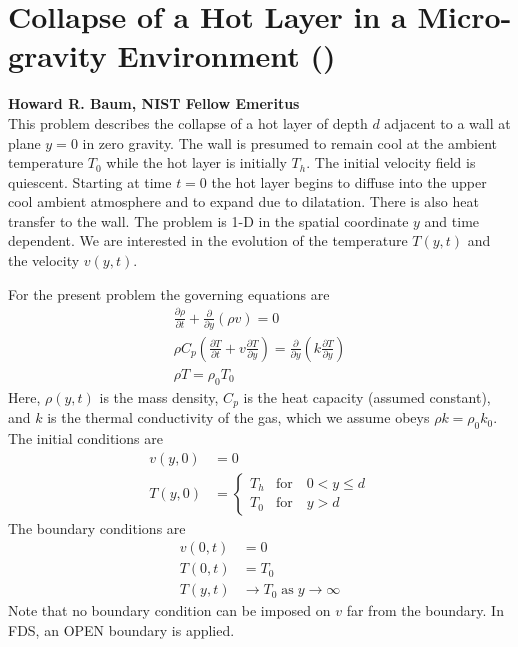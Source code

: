 \documentclass[11pt]{book}
\begin{document}
\section{Collapse of a Hot Layer in a Micro-gravity Environment (\texorpdfstring{}{hot\_layer\_360})}
\label{sec:baum_hot_layer}

\textbf{Howard R. Baum, NIST Fellow Emeritus}\\

\noindent This problem describes the collapse of a hot layer of depth $d$ adjacent to a wall at plane $y=0$ in zero gravity.  The wall is presumed to remain cool at the ambient temperature $T_0$ while the hot layer is initially $T_h$.  The initial velocity field is quiescent.  Starting at time $t=0$ the hot layer begins to diffuse into the upper cool ambient atmosphere and to expand due to dilatation.  There is also heat transfer to the wall.  The problem is 1-D in the spatial coordinate $y$ and time dependent.  We are interested in the evolution of the temperature $T(y,t)$ and the velocity $v(y,t)$.

For the present problem the governing equations are
\begin{gather}
\frac{\partial \rho}{\partial t} + \frac{\partial}{\partial y}(\rho v) = 0 \\
\rho C_p \left( \frac{\partial T}{\partial t} + v \frac{\partial T}{\partial y} \right) = \frac{\partial}{\partial y} \left( k \frac{\partial T}{\partial y} \right) \\
\rho T = \rho_0 T_0
\end{gather}
Here, $\rho(y,t)$ is the mass density, $C_p$ is the heat capacity (assumed constant), and $k$ is the thermal conductivity of the gas, which we assume obeys $\rho k = \rho_0 k_0$. The initial conditions are
\begin{align}
v(y,0) &= 0 \\
T(y,0) &= \left\{ \begin{array}{ll} T_h & \mbox{for} \quad 0 < y \le d \\ T_0 & \mbox{for} \quad y > d \end{array} \right.
\end{align}
The boundary conditions are
\begin{align}
v(0,t) &= 0 \\
T(0,t) &= T_0 \\
T(y,t) &\rightarrow T_0 \;\mbox{as}\; y\rightarrow\infty
\end{align}
Note that no boundary condition can be imposed on $v$ far from the boundary.  In FDS, an {\ct OPEN} boundary is applied.
\end{document}
